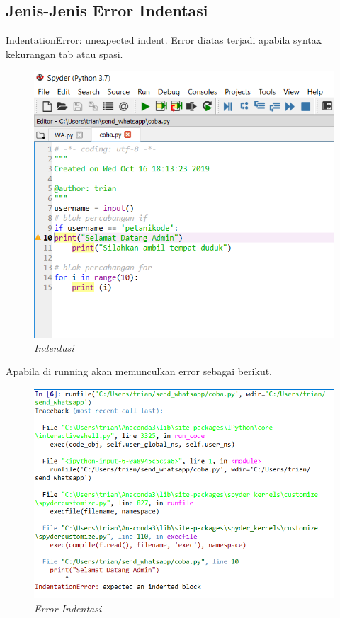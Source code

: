 \subsection{Jenis-Jenis Error Indentasi}
IndentationError: unexpected indent. Error diatas terjadi apabila syntax kekurangan tab atau spasi.
\begin{figure}[H]
    \centering
    \includegraphics[scale=0.6]{figures/indentasi}
    \caption{\textit{Indentasi}}
    \label{Indentasi}
\end{figure}
Apabila di running akan memunculkan error sebagai berikut.
\begin{figure}[H]
    \centering
    \includegraphics[scale=0.6]{figures/errorindentasi}
    \caption{\textit{Error Indentasi}}
    \label{Error Indentasi}
\end{figure}


